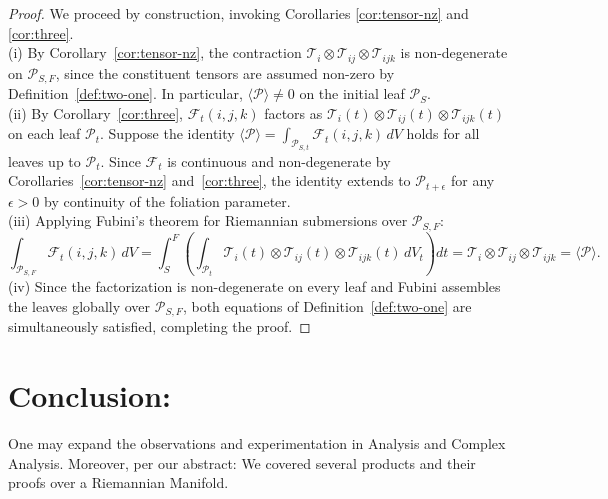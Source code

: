 \documentclass[10pt]{article}
\theoremstyle{plain}
\theoremstyle{definition}
\theoremstyle{remark}
\begin{document}
\begin{proof}
\label{proof:construc}
We proceed by construction, invoking Corollaries \ref{cor:tensor-nz} and \ref{cor:three}.\\
(i) By Corollary~\ref{cor:tensor-nz}, the contraction $\mathcal{T}_i \otimes \mathcal{T}_{ij} \otimes \mathcal{T}_{ijk}$ is non-degenerate on $\mathcal{P}_{S,F}$, since the constituent tensors are assumed non-zero by Definition~\ref{def:two-one}. In particular, $\langle \mathcal{P} \rangle \neq 0$ on the initial leaf $\mathcal{P}_S$.\\
(ii) By Corollary~\ref{cor:three}, $\mathcal{F}_t(i,j,k)$ factors as $\mathcal{T}_i(t) \otimes \mathcal{T}_{ij}(t) \otimes \mathcal{T}_{ijk}(t)$ on each leaf $\mathcal{P}_t$. Suppose the identity $\langle \mathcal{P} \rangle = \int_{\mathcal{P}_{S,t}} \mathcal{F}_t(i,j,k)\,dV$ holds for all leaves up to $\mathcal{P}_t$. Since $\mathcal{F}_t$ is continuous and non-degenerate by Corollaries~\ref{cor:tensor-nz} and~\ref{cor:three}, the identity extends to $\mathcal{P}_{t+\epsilon}$ for any $\epsilon > 0$ by continuity of the foliation parameter.\\
(iii) Applying Fubini's theorem for Riemannian submersions over $\mathcal{P}_{S,F}$:
\begin{equation}
  \int_{\mathcal{P}_{S,F}} \mathcal{F}_t(i,j,k)\,dV
  = \int_{S}^{F} \left(\int_{\mathcal{P}_t} \mathcal{T}_i(t) \otimes \mathcal{T}_{ij}(t) \otimes \mathcal{T}_{ijk}(t)\,dV_t\right) dt
  = \mathcal{T}_i \otimes \mathcal{T}_{ij} \otimes \mathcal{T}_{ijk}
  = \langle \mathcal{P} \rangle.
\end{equation}
(iv) Since the factorization is non-degenerate on every leaf and Fubini assembles the leaves globally over $\mathcal{P}_{S,F}$, both equations of Definition~\ref{def:two-one} are simultaneously satisfied, completing the proof.
\end{proof}

\section{Conclusion:}

One may expand the observations and experimentation in Analysis and Complex Analysis. Moreover, per our abstract: We covered several products and their proofs over a Riemannian Manifold.

\nocite{*}



\end{document}
